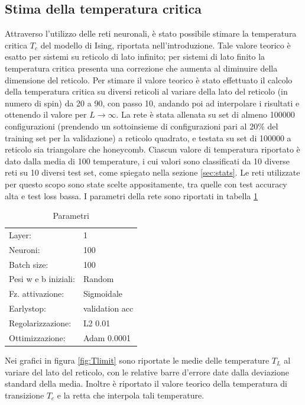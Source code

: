 \documentclass{article}
\begin{document}
\subsection{Stima della temperatura critica}
Attraverso l'utilizzo delle reti neuronali, è stato possibile stimare la temperatura critica $T_c$ del modello di Ising, riportata nell'introduzione.
Tale valore teorico è esatto per sistemi su reticolo di lato infinito; per sistemi di lato finito la temperatura critica presenta una correzione che aumenta al diminuire della dimensione del reticolo.
Per stimare il valore teorico è stato effettuato il calcolo della temperatura critica su diversi reticoli al variare della lato del reticolo (in numero di spin) da 20 a 90, con passo 10, andando poi ad interpolare i risultati e ottenendo il valore per $L\rightarrow \infty$.
La rete è stata allenata su set di almeno \num{100000} configurazioni (prendendo un sottoinsieme di configurazioni pari al $20\%$ del training set per la validazione) a reticolo quadrato, e testata su set di \num{100000} a reticolo sia triangolare che honeycomb.
Ciascun valore di temperatura riportato è dato dalla media di 100 temperature, i cui valori sono classificati da 10 diverse reti su 10 diversi test set, come spiegato nella sezione \ref{sec:stats}.
Le reti utilizzate per questo scopo sono state scelte appositamente, tra quelle con test accuracy alta e test loss bassa.
I parametri della rete sono riportati in tabella \ref{tab:ffnnpar}

\begin{table}[ht]
\begin{center}
\begin{tabular}{ll}
\toprule
Layer: & 1\\
Neuroni: & 100 \\
Batch size: & 100\\
Pesi w e b iniziali: & Random\\
Fz. attivazione: & Sigmoidale\\
Earlystop: & validation acc \\
Regolarizzazione: & L2 0.01\\
Ottimizzazione: & Adam 0.0001 \\
\bottomrule
\end{tabular}
\end{center}
\caption{Parametri}
\label{tab:ffnnpar}
\end{table}

Nei grafici in figura \ref{fig:Tlimit} sono riportate le medie delle temperature $T_L$ al variare del lato del reticolo, con le relative barre d'errore date dalla deviazione standard della media.
Inoltre è riportato il valore teorico della temperatura di transizione $T_c$ e la retta che interpola tali temperature.
\end{document}
